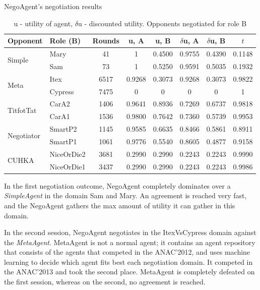 \documentclass[html]{report}    %
\begin{document}
\begin{table}[htbp] 
	\centering %
	\caption{NegoAgent's negotiation results}
	\setlength{\tabcolsep}{0.5em}
	\begin{tabular}{llcccccc} %
		\toprule[0.15em] 
		 Opponent  &  Role (B) & Rounds & u, A & u, B & $\delta$u, A & $\delta$u, B & $t$\\ [0.5ex] %
		\midrule 
		\multirow{2}{*}{Simple}&Mary&41&1&0.4500&0.9755&0.4390&0.1148\\
		&Sam&73&1&0.5250&0.9591&0.5035&0.1932\\ 
		\midrule
		\multirow{2}{*}{Meta}&Itex&6517&0.9268&0.3073&0.9268&0.3073&0.9822\\
		&Cypress&7475&0&0&0&0&1\\
		\midrule
		\multirow{2}{*}{TitfotTat}&CarA2&1406&0.9641&0.8936&0.7269&0.6737&0.9818\\
		&CarA1&1536&0.9800&0.7642&0.7360&0.5739&0.9953\\
		\midrule
		\multirow{2}{*}{Negotiator}&SmartP2&1145&0.9585&0.6635&0.8466&0.5861&0.8911\\
		&SmartP1&1061&0.9776&0.5540&0.8605&0.4877&0.9158\\
		\midrule
		\multirow{2}{*}{CUHKA}&NiceOrDie2&3681&0.2990&0.2990&0.2243&0.2243&0.9990\\
		&NiceOrDie1&3437&0.2990&0.2990&0.2243&0.2243&0.9986\\
		\bottomrule[0.15em] 
	\end{tabular}
	 
	\caption*{u - utility of agent, $\delta$u - discounted utility. Opponents negotiated for role B} 
	\label{table:NegoSimpleResults} %
\end{table} 

In the first negotiation outcome, NegoAgent completely dominates over a \textit{SimpleAgent} in the domain Sam and Mary. An agreement is reached very fast, and the NegoAgent gathers the max amount of utility it can gather in this domain. 

In the second session, NegoAgent negotiates in the ItexVsCypress domain against the \textit{MetaAgent}. MetaAgent is not a normal agent; it contains an agent repository that consists of the agents that competed in the ANAC'2012, and uses machine learning to decide which agent fits best each negotiation domain. It competed in the ANAC'2013 and took the second place. MetaAgent is completely defeated on the first session, whereas on the second, no agreement is reached.
\end{document}
